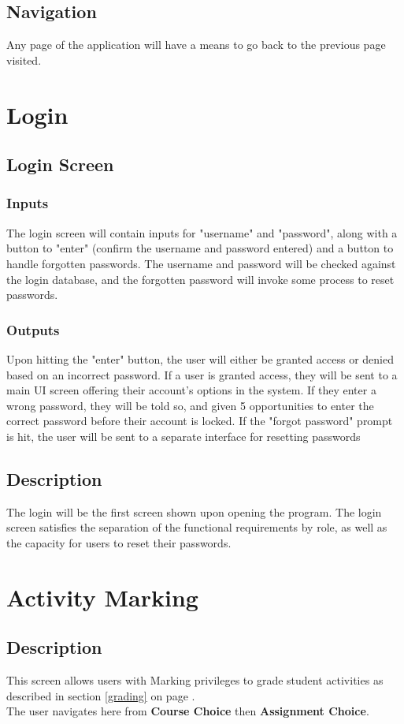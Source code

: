 \documentclass{article}
\begin{document}
\subsection{Navigation}
Any page of the application will have a means to go back to the previous
page visited.

\section{Login}
\subsection{Login Screen}
\subsubsection{Inputs}
The login screen will contain inputs for "username" and "password", along with a
button to "enter" (confirm the username and password entered) and a button to handle
forgotten passwords. The username and password will be checked against the login database,
and the forgotten password will invoke some process to reset passwords.
\subsubsection{Outputs}
Upon hitting the "enter" button, the user will either be granted access or denied based
on an incorrect password. If a user is granted access, they will be sent
to a main UI screen offering their account's options in the system. If they enter a wrong
password, they will be told so, and given 5 opportunities to enter the correct password
before their account is locked. If the "forgot password" prompt is hit, the user will be sent
to a separate interface for resetting passwords
\subsection{Description}
The login will be the first screen shown upon opening the program. The login screen 
satisfies the separation of the functional requirements by role, as well as the capacity for users
to reset their passwords.

\section{Activity Marking}
\subsection{Description}
This screen allows users with Marking privileges to grade student activities
as described in section \ref{grading} on page \pageref{grading}.\\
The user navigates here from \textbf{Course Choice} then \textbf{Assignment Choice}.
\end{document}
